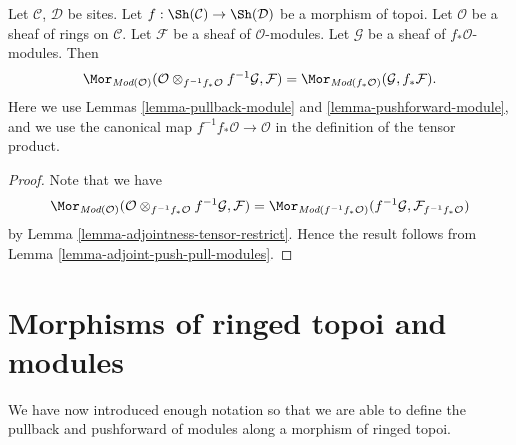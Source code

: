 \begin{lemma}
\label{lemma-adjoint-pull-push-modules}
Let $\mathcal{C}$, $\mathcal{D}$ be sites.
Let $f : \Sh(\mathcal{C}) \to \Sh(\mathcal{D})$
be a morphism of topoi.
Let $\mathcal{O}$ be a sheaf of rings on $\mathcal{C}$.
Let $\mathcal{F}$ be a sheaf of $\mathcal{O}$-modules.
Let $\mathcal{G}$ be a sheaf of $f_*\mathcal{O}$-modules.
Then
$$
\Mor_{\textit{Mod}(\mathcal{O})}(
\mathcal{O} \otimes_{f^{-1}f_*\mathcal{O}} f^{-1}\mathcal{G}, \mathcal{F})
=
\Mor_{\textit{Mod}(f_*\mathcal{O})}(\mathcal{G}, f_*\mathcal{F}).
$$
Here we use
Lemmas \ref{lemma-pullback-module}
and \ref{lemma-pushforward-module}, and we use
the canonical map $f^{-1}f_*\mathcal{O} \to \mathcal{O}$
in the definition of the tensor product.
\end{lemma}

\begin{proof}
Note that we have
$$
\Mor_{\textit{Mod}(\mathcal{O})}(
\mathcal{O} \otimes_{f^{-1}f_*\mathcal{O}} f^{-1}\mathcal{G}, \mathcal{F})
=
\Mor_{\textit{Mod}(f^{-1}f_*\mathcal{O})}(
f^{-1}\mathcal{G}, \mathcal{F}_{f^{-1}f_*\mathcal{O}})
$$
by Lemma \ref{lemma-adjointness-tensor-restrict}. Hence the result follows
from Lemma \ref{lemma-adjoint-push-pull-modules}.
\end{proof}






\section{Morphisms of ringed topoi and modules}
\label{section-functoriality-modules}

\noindent
We have now introduced enough notation so that we are able to
define the pullback and pushforward of modules along a morphism
of ringed topoi.

